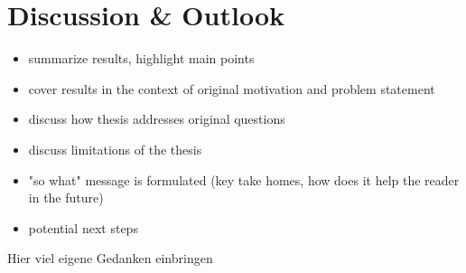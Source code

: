 \chapter{Discussion \& Outlook}
\label{cha:discussion}

\begin{itemize}
    \item summarize results, highlight main points
    \item cover results in the context of original motivation and problem statement
    \item discuss how thesis addresses original questions
    \item discuss limitations of the thesis
    \item "so what" message is formulated (key take homes, how does it help the reader in the future)
    \item potential next steps
\end{itemize}

Hier viel eigene Gedanken einbringen
